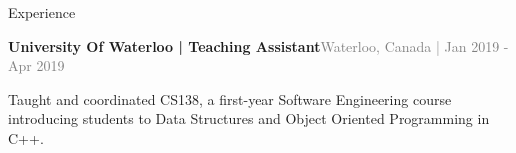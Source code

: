 \documentclass[hidelinks]{resume} %
\begin{document}
\begin{rSection}{Experience}
\begin{rSubsection}{\textbf{University Of Waterloo | Teaching Assistant}}{\textcolor{gray}{\small Waterloo, Canada | Jan 2019 - Apr 2019}}{}
    \begin{bulletpoints}
        \vspace{-.10cm}
        \item Taught and coordinated CS138, a first-year Software Engineering course introducing students to Data Structures and Object Oriented Programming in C++.
        \vspace{-.10cm}
    \end{bulletpoints}   

\end{rSubsection}

\end{rSection}

\vspace{-.1cm}
\end{document}
